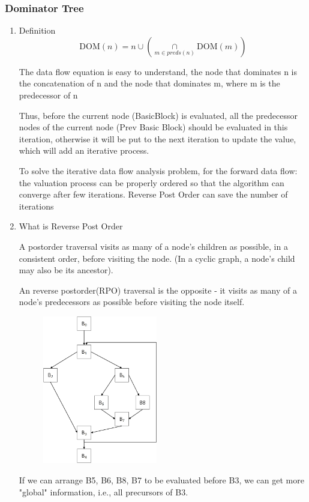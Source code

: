 \documentclass[a4paper]{exam}
\theoremstyle{definition}
\begin{document}
\subsubsection{Dominator Tree \cite{cs153lec23}}
\begin{enumerate}
\item Definition
$$ \text{DOM}(n)={n} \cup\left ( \mathop{\cap}\limits_{m \in preds(n)} \text{DOM}(m) \right) $$

The data flow equation is easy to understand, the node that dominates n is the concatenation of n and the node that dominates m, where m is the predecessor of n

Thus, before the current node (BasicBlock) is evaluated, all the predecessor nodes of the current node (Prev Basic Block) should be evaluated in this iteration, otherwise it will be put to the next iteration to update the value, which will add an iterative process.

To solve the iterative data flow analysis problem, for the forward data flow: the valuation process can be properly ordered so that the algorithm can converge after few iterations. Reverse Post Order can save the number of iterations

\item What is Reverse Post Order

A postorder traversal visits as many of a node’s children as possible, in a consistent order, before visiting the node. (In a cyclic graph, a node’s child may also be its ancestor).

An reverse postorder(RPO) traversal is the opposite - it visits as many of a node’s predecessors as possible before visiting the node itself.
\begin{figure}[htbp]
  \centering
  \includegraphics[width=5cm]{./img/figure0.png}
\end{figure}

If we can arrange B5, B6, B8, B7 to be evaluated before B3, we can get more "global" information, i.e., all precursors of B3.


\end{enumerate}
\end{document}

